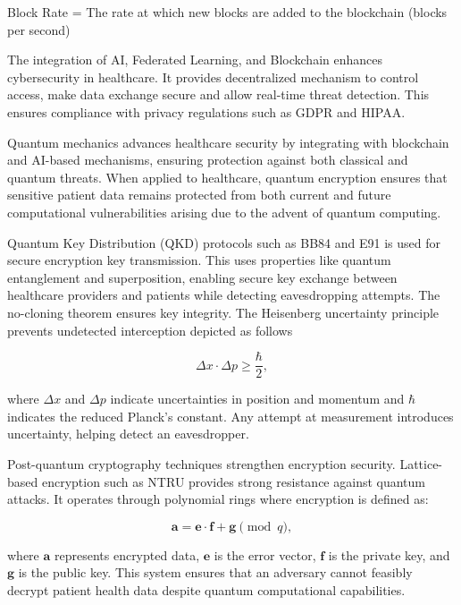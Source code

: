 \documentclass[pdflatex,sn-mathphys-num]{sn-jnl}%
\theoremstyle{thmstyleone}%
\theoremstyle{thmstyletwo}%
\theoremstyle{thmstylethree}%
\begin{document}
\noindent Block Rate = The rate at which new blocks are added to the blockchain (blocks per second)

The integration of AI, Federated Learning, and Blockchain enhances cybersecurity in healthcare. It provides decentralized mechanism to control access, make data exchange secure and allow real-time threat detection. This ensures compliance with privacy regulations such as GDPR and HIPAA\cite{bib10}.

Quantum mechanics advances healthcare security by integrating with blockchain and AI-based mechanisms\cite{bib11,bib12}, ensuring protection against both classical and quantum threats. When applied to healthcare, quantum encryption ensures that sensitive patient data remains protected from both current and future computational vulnerabilities arising due to the advent of quantum computing.  

Quantum Key Distribution (QKD) protocols such as BB84 and E91 is used for secure encryption key transmission. This uses properties like quantum entanglement and superposition, enabling secure key exchange between healthcare providers and patients while detecting eavesdropping attempts. The no-cloning theorem ensures key integrity. The Heisenberg uncertainty principle prevents undetected interception depicted as follows 

\begin{equation}  
\Delta x \cdot \Delta p \geq \frac{\hbar}{2},  
\end{equation}  

where \( \Delta x \) and \( \Delta p \) indicate uncertainties in position and momentum and \( \hbar \) indicates the reduced Planck's constant. Any attempt at measurement introduces uncertainty, helping detect an eavesdropper.  

Post-quantum cryptography techniques strengthen encryption security. Lattice-based encryption such as NTRU provides strong resistance against quantum attacks\cite{bib12}. It operates through polynomial rings where encryption is defined as: 

\begin{equation}  
\mathbf{a} = \mathbf{e} \cdot \mathbf{f} + \mathbf{g} \pmod{q},  
\end{equation}  

where \( \mathbf{a} \) represents encrypted data, \( \mathbf{e} \) is the error vector, \( \mathbf{f} \) is the private key, and \( \mathbf{g} \) is the public key. This system ensures that an adversary cannot feasibly decrypt patient health data despite quantum computational capabilities.  
\end{document}
